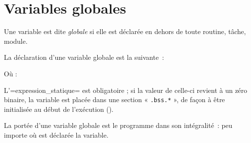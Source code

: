 




\chapter{Variables globales}

Une variable est dite \emph{globale} si elle est déclarée en dehors de toute routine, tâche, module.


%





La déclaration d'une variable globale est la suivante~:


Où :

L'\plm=expression_statique= est obligatoire ; si la valeur de celle-ci revient à un zéro binaire, la variable est placée dans une section « \texttt{.bss.*} », de façon à être initialisée au début de l'exécution ().

La portée d'une variable globale est le programme dans son intégralité~: peu importe où est déclarée la variable.

